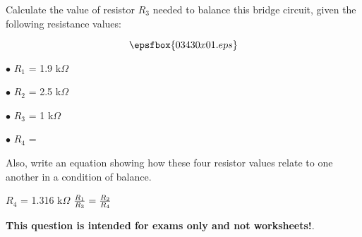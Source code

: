 

Calculate the value of resistor $R_3$ needed to balance this bridge circuit, given the following resistance values:

$$\epsfbox{03430x01.eps}$$

\medskip
\item{$\bullet$} $R_1$ = 1.9 k$\Omega$
\vskip 5pt
\item{$\bullet$} $R_2$ = 2.5 k$\Omega$
\vskip 5pt
\item{$\bullet$} $R_3$ = 1 k$\Omega$
\vskip 5pt
\item{$\bullet$} $R_4$ = 
\medskip

Also, write an equation showing how these four resistor values relate to one another in a condition of balance.







$R_4$ = 1.316 k$\Omega$ \hskip 100pt ${R_1 \over R_3} = {R_2 \over R_4}$







{\bf This question is intended for exams only and not worksheets!}.




